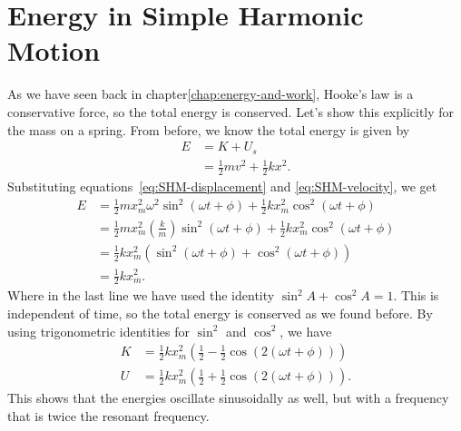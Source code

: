 \documentclass[../classical_mechanics.tex]{subfiles}
\begin{document}
    \section{Energy in Simple Harmonic Motion}\label{sec:energy-in-simple-harmonic-motion}
        As we have seen back in chapter\ref{chap:energy-and-work}, Hooke's law is a conservative force, so the total energy is conserved.
        Let's show this explicitly for the mass on a spring.
        From before, we know the total energy is given by
        \begin{align}
            E&=K+U_s\\
            &=\frac{1}{2}mv^2+\frac{1}{2}kx^2.
        \end{align}
        Substituting equations~\ref{eq:SHM-displacement} and \ref{eq:SHM-velocity}, we get
        \begin{align}
            E&=\frac{1}{2}mx_m^2\omega^2\sin^2(\omega t+\phi)+\frac{1}{2}kx_m^2\cos^2(\omega t+\phi)\\
            &=\frac{1}{2}mx_m^2\left(\frac{k}{m}\right)\sin^2(\omega t+\phi)+\frac{1}{2}kx_m^2\cos^2(\omega t+\phi)\\
            &=\frac{1}{2}kx_m^2\left(\sin^2(\omega t+\phi)+\cos^2(\omega t+\phi)\right)\\
            &=\frac{1}{2}kx_m^2.\label{eq:SHM-total-mech-energy}
        \end{align}
        Where in the last line we have used the identity $\sin^2A+\cos^2A=1$.
        This is independent of time, so the total energy is conserved as we found before.
        By using trigonometric identities for $\sin^2$ and $\cos^2$, we have
        \begin{align}
            K&=\frac{1}{2}kx_m^2\left(\frac{1}{2}-\frac{1}{2}\cos(2(\omega t+\phi))\right)\\
            U&=\frac{1}{2}kx_m^2\left(\frac{1}{2}+\frac{1}{2}\cos(2(\omega t+\phi))\right).
        \end{align}
        This shows that the energies oscillate sinusoidally as well, but with a frequency that is twice the resonant frequency.
\end{document}
